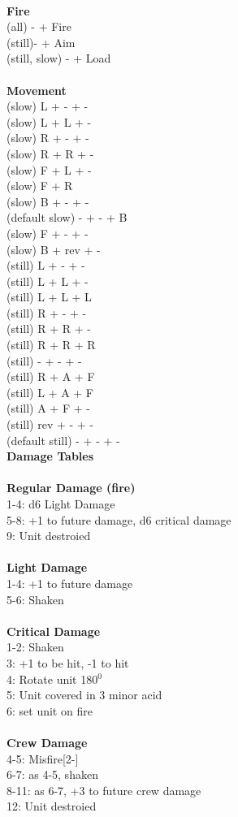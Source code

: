 \ \\ {\bf Fire } \\
(all) - + Fire \\
(still)- + Aim \\
(still, slow) - + Load \\
\ \\ {\bf Movement } \\
(slow) L + - + - \\
(slow) L + L + - \\
(slow) R + - + - \\
(slow) R + R + - \\
(slow) F + L + - \\
(slow) F + R \\
(slow) B + - + - \\
(default slow) - + - + B \\
(slow) F + - + - \\
(slow) B + rev + - \\
(still) L + - + - \\
(still) L + L + - \\
(still) L + L + L \\
(still) R + - + - \\
(still) R + R + - \\
(still) R + R + R \\
(still) - + - + - \\
(still) R + A + F \\
(still) L + A + F \\
(still) A + F + - \\
(still) rev + - + - \\
(default still) - + - + - \\



{\bf Damage Tables} \\
\ \\ {\bf Regular Damage (fire) } \\
1-4: d6 Light Damage \\
5-8: +1 to future damage, d6 critical damage \\
9: Unit destroied \\
\ \\ {\bf Light Damage } \\
1-4: +1 to future damage \\
5-6: Shaken \\
\ \\ {\bf Critical Damage } \\
1-2: Shaken \\
3: +1 to be hit, -1 to hit \\
4: Rotate unit 180$^0$ \\
5: Unit covered in 3 minor acid \\
6: set unit on fire \\
\ \\ {\bf Crew Damage } \\
4-5: Misfire[2-] \\
6-7: as 4-5, shaken \\
8-11: as 6-7, +3 to future crew damage \\
12: Unit destroied \\


